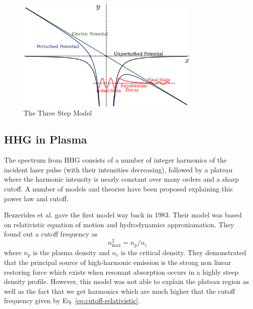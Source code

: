 \documentclass[12pt]{article}
\begin{document}
\begin{figure}[h]
    \centering
    \includegraphics[width=0.8\textwidth]{images/three_step_two.png}
    \caption{The Three Step Model}
    \label{fig:3-step-2}
\end{figure}

\subsection{HHG in Plasma}
The spectrum from HHG consists of a number of integer harmonics of the incident laser pulse (with their intensities decreasing), followed by a plateau where the harmonic intensity is nearly constant over many orders and a sharp cutoff. A number of models and theories have been proposed explaining this power law and cutoff.

Bezzerides et al. \cite{hhg-relativistic} gave the first model way back in 1983. Their model was based on relativistic equation of motion and hydrodynamics approxiamation. They found out a cutoff frequency as
\begin{equation}
    \label{eq:cutoff-relativistic}
    n_{\max}^2 = n_p/n_c
\end{equation}
where $n_p$ is the plasma density and $n_c$ is the critical density. They demonstrated that the principal source of high-harmonic emission is the strong non linear restoring force which exists when resonant absorption occurs in a highly steep density profile. However, this model was not able to explain the plateau region as well as the fact that we get harmonics which are much higher that the cutoff frequency given by Eq. \ref{eq:cutoff-relativistic}.
\end{document}
